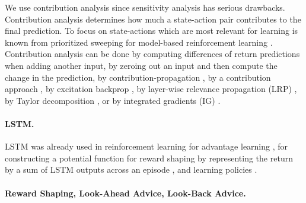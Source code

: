 \documentclass{article}
\begin{document}
\begin{appendices}
We use contribution analysis
since sensitivity analysis has serious drawbacks.
Contribution analysis determines how much a state-action pair
contributes to the final prediction.
To focus on state-actions which are most relevant for learning 
is known from prioritized sweeping 
for model-based reinforcement learning \cite{Moore:93}. 
Contribution analysis can be done 
by computing differences of return predictions when adding another input,
by zeroing out an input and then compute the change in the prediction,
by contribution-propagation \cite{Landecker:13},
by a contribution approach \cite{Poulin:06},
by excitation backprop \cite{Zhang:16},
by layer-wise relevance propagation (LRP) \cite{Bach:15},
by Taylor decomposition \cite{Bach:15,Montavon:17taylor}, or 
by integrated gradients (IG) \cite{Sundararajan:17}.


\paragraph{LSTM.}

LSTM was already used in reinforcement learning \cite{Schmidhuber:15}
for advantage learning \cite{Bakker:02}, for constructing a potential 
function for reward shaping by representing the return by a sum of 
LSTM outputs across an episode \cite{Su:15}, and
learning policies \cite{Hausknecht:15,Mnih:16,Heess:16}.


\paragraph{Reward Shaping, Look-Ahead Advice, Look-Back Advice.}


\end{appendices}
\end{document}
